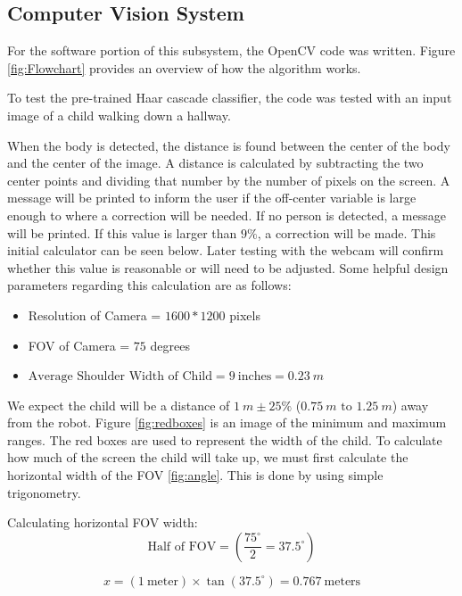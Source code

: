 \documentclass{report}
\begin{document}
    \subsection{Computer Vision System}
    For the software portion of this subsystem, the OpenCV code was written. Figure \ref{fig:Flowchart} provides an overview of how the algorithm works.

    To test the pre-trained Haar cascade classifier, the code was tested with an input image of a child walking down a hallway.

    When the body is detected, the distance is found between the center of the body and the center of the image. A distance is calculated by subtracting the two center points and dividing that number by the number of pixels on the screen. A message will be printed to inform the user if the off-center variable is large enough to where a correction will be needed. If no person is detected, a message will be printed. If this value is larger than $9\%$, a correction will be made. This initial calculator can be seen below. Later testing with the webcam will confirm whether this value is reasonable or will need to be adjusted. Some helpful design parameters regarding this calculation are as follows:

    \begin{itemize}
      \item Resolution of Camera = $1600 * 1200$ pixels
      \item FOV of Camera = $75$ degrees
      \item $\text{Average Shoulder Width of Child} = 9~\text{inches} = 0.23~m$
    \end{itemize}

    We expect the child will be a distance of $1~m \pm 25\%$ ($0.75~m \text{ to } 1.25~m$) away from the robot. Figure \ref{fig:redboxes} is an image of the minimum and maximum ranges. The red boxes are used to represent the width of the child. To calculate how much of the screen the child will take up, we must first calculate the horizontal width of the FOV \ref{fig:angle}. This is done by using simple trigonometry.

    Calculating horizontal FOV width:
    \begin{equation}
        \text{Half of FOV} = (\frac{75^\circ}{2} = 37.5^\circ )
      \nonumber
    \end{equation}

    \begin{equation}
      x = (1~\text{meter}) \times \tan(37.5^\circ) = 0.767~\text{meters}
    \nonumber
    \end{equation}
\end{document}
